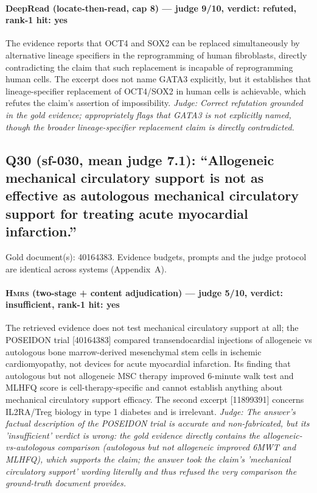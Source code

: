\documentclass[sigconf, review, anonymous]{acmart}
\begin{document}
\paragraph{DeepRead (locate-then-read, cap 8) --- judge 9/10, verdict: refuted, rank-1 hit: yes}
\noindent The evidence reports that OCT4 and SOX2 can be replaced simultaneously by alternative lineage specifiers in the reprogramming of human fibroblasts, directly contradicting the claim that such replacement is incapable of reprogramming human cells. The excerpt does not name GATA3 explicitly, but it establishes that lineage-specifier replacement of OCT4/SOX2 in human cells is achievable, which refutes the claim's assertion of impossibility.
\noindent\small\textit{Judge: Correct refutation grounded in the gold evidence; appropriately flags that GATA3 is not explicitly named, though the broader lineage-specifier replacement claim is directly contradicted.}

\subsection{Q30 (sf-030, mean judge 7.1): ``Allogeneic mechanical circulatory support is not as effective as autologous mechanical circulatory support for treating acute myocardial infarction.''}
\label{app:q30}
\noindent Gold document(s): 40164383. Evidence budgets, prompts and the judge protocol are identical across systems (Appendix~A).
\paragraph{\textbf{\textsc{Hmrs}} (two-stage + content adjudication) --- judge 5/10, verdict: insufficient, rank-1 hit: yes}
\noindent The retrieved evidence does not test mechanical circulatory support at all; the POSEIDON trial [40164383] compared transendocardial injections of allogeneic vs autologous bone marrow-derived mesenchymal stem cells in ischemic cardiomyopathy, not devices for acute myocardial infarction. Its finding that autologous but not allogeneic MSC therapy improved 6-minute walk test and MLHFQ score is cell-therapy-specific and cannot establish anything about mechanical circulatory support efficacy. The second excerpt [11899391] concerns IL2RA/Treg biology in type 1 diabetes and is irrelevant.
\noindent\small\textit{Judge: The answer's factual description of the POSEIDON trial is accurate and non-fabricated, but its 'insufficient' verdict is wrong: the gold evidence directly contains the allogeneic-vs-autologous comparison (autologous but not allogeneic improved 6MWT and MLHFQ), which supports the claim; the answer took the claim's 'mechanical circulatory support' wording literally and thus refused the very comparison the ground-truth document provides.}
\end{document}
